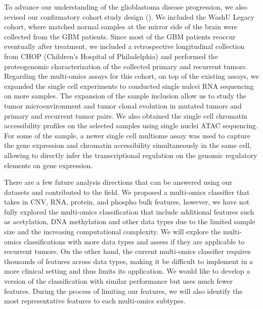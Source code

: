 To advance our understanding of the glioblastoma disease progression, we also revised our confirmatory cohort study design (). We included the WashU Legacy cohort, where matched normal samples at the mirror side of the brain were collected from the GBM patients. Since most of the GBM patients reoccur eventually after treatment, we included a retrospective longitudinal collection from CHOP (Children's Hospital of Philadelphia) and performed the proteogenomic characterization of the collected primary and recurrent tumors. Regarding the multi-omics assays for this cohort, on top of the existing assays, we expanded the single cell experiments to conducted single nulcei RNA sequencing on more samples. The expansion of the sample inclusion allow us to study the tumor microenvironment and tumor clonal evolution in  mutated tumors and primary and recurrent tumor pairs. We also obtained the single cell chromatin accessibility profiles on the selected samples using single nuclei ATAC sequencing. For some of the sample, a newer single cell multiome assay was used to capture the gene expression and chromatin accessibility simultaneously in the same cell, allowing to directly infer the transcriptional regulation on the genomic regulatory elements on gene expression.

There are a few future analysis directions that can be answered using our datasets and contributed to the field. We proposed a multi-omics classifier that takes in CNV, RNA, protein, and phospho bulk features, however, we have not fully explored the multi-omics classification that include additional features such as acetylation, DNA methylation and other data types due to the limited sample size and the increasing computational complexity. We will explore the multi-omics classifications with more data types and assess if they are applicable to recurrent tumors. On the other hand, the current multi-omics classifier requires thousands of features across data types, making it be difficult to implement in a more clinical setting and thus limits its application. We would like to develop a version of the classification with similar performance but uses much fewer features. During the process of limiting our features, we will also identify the most representative features to each multi-omics subtypes.

